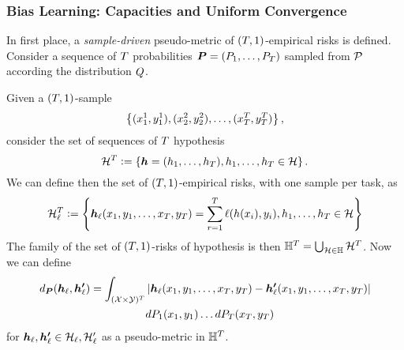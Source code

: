\subsubsection*{Bias Learning: Capacities and Uniform Convergence}
In first place, a \emph{sample-driven} pseudo-metric of $(T, 1)$-empirical risks is defined.
Consider a sequence of $T$ probabilities $\bm{P} = (P_1, \ldots, P_T)$ sampled from $\mathcal{P}$ according the distribution $Q$. 
\begin{definition}
    \label{def:sample_pseudometric}
    Given a $(T, 1)$-sample 
    $$\left\{(x_1^1, y_1^1), (x_2^2, y_2^2), \ldots, (x_T^T, y_T^T) \right\},$$
    consider the set of sequences of $T$ hypothesis 
$$\mathcal{H}^T \vcentcolon= \left\{ \bm{h} = (h_1, \ldots, h_T) , h_1, \ldots, h_T \in \mathcal{H}\right\} .$$
We can define then the set of $(T, 1)$-empirical risks, with one sample per task, as 
$$\mathcal{H}^T_\ell \vcentcolon= \left\{ \bm{h}_\ell(x_1, y_1, \ldots, x_T, y_T) = \sum_{r=1}^T \ell(h(x_i), y_i) , h_1, \ldots, h_T \in \mathcal{H}\right\} $$
The family of the set of $(T, 1)$-risks of hypothesis is then $\mathbb{H}^{T} = \bigcup_{\mathcal{H} \in \mathbb{H}} \mathcal{H}^T$. Now we can define
\begin{equation}
    \nonumber
    \begin{aligned}
        d_{\bm{P}}(\bm{h}_\ell, \bm{h'}_\ell) = \int_{(\mathcal{X} \times \mathcal{Y})^{T}} &\left|\bm{h}_\ell(x_1, y_1, \ldots, x_T, y_T) - \bm{h'}_\ell(x_1, y_1, \ldots, x_T, y_T)\right| \\ 
        & d{P_1}(x_1, y_1) \ldots d{P_T}(x_T, y_T)
    \end{aligned}
\end{equation}
for $\bm{h}_\ell, \bm{h'}_\ell \in \mathcal{H}_\ell, \mathcal{H}'_\ell$ as a pseudo-metric in $\mathbb{H}^T$.
\end{definition}
%


